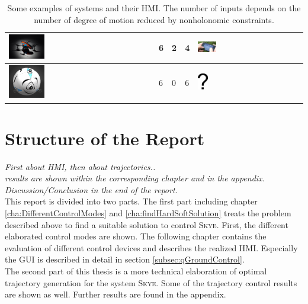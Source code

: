 \begin{table}[H]
\begin{center}
\begin{tabular}{MMMMM}
  \hline
    \includegraphics[width = 0.25\textwidth]{ardrone.jpg}
   & 	6 & 2  & 4 & \includegraphics[width = 0.18\textwidth]{iphone.jpg} \\
  \hline
    \includegraphics[width = 0.25\textwidth]{skye.jpg}
   & 	6 & 0  & 6 & \includegraphics[width = 0.1\textwidth]{questionmark.eps} \\
 \hline
 \end{tabular}
 \caption{Some examples of systems and their HMI. The number of inputs depends on the number of degree of motion reduced by nonholonomic constraints.}\vspace{1ex}
 \label{tab:systems_hmi}
\end{center}
\end{table}


\section{Structure of the Report}
\label{structure}
\textit{First about HMI, then about trajectories.. \\ results are shown within the corresponding chapter and in the appendix. Discussion/Conclusion in the end of the report.} \\
This report is divided into two parts. The first part including chapter \ref{cha:DifferentControlModes} and \ref{cha:findHardSoftSolution} treats the problem described above to find a suitable solution to control \textsc{Skye}. First, the different elaborated control modes are shown. The following chapter contains the evaluation of different control devices and describes the realized HMI. Especially the GUI is described in detail in section \ref{subsec:qGroundControl}. \\ The second part of this thesis is a more technical elaboration of optimal trajectory generation for the system \textsc{Skye}. Some of the trajectory control results are shown as well. Further results are found in the appendix.